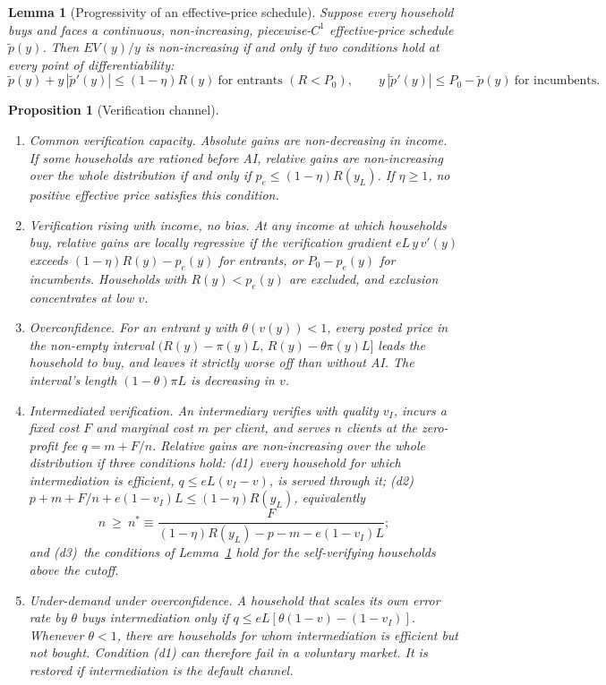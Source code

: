 \documentclass[12pt]{article}
\newtheorem{proposition}{Proposition}
\newtheorem{lemma}{Lemma}
\theoremstyle{remark}
\begin{document}
\begin{lemma}[Progressivity of an effective-price schedule]\label{lem:schedule}
Suppose every household buys and faces a continuous, non-increasing, piecewise-$C^1$ effective-price schedule $\tilde p(y)$. Then $EV(y)/y$ is non-increasing if and only if two conditions hold at every point of differentiability:
\[
\tilde p(y)+y\,|\tilde p'(y)|\le(1-\eta)R(y)\ \text{for entrants }(R<P_0),\qquad y\,|\tilde p'(y)|\le P_0-\tilde p(y)\ \text{for incumbents}.
\]
\end{lemma}

\begin{proposition}[Verification channel]\label{prop:verification}
\begin{enumerate}[label=(\alph*),itemsep=1pt]
\item \emph{Common verification capacity.} Absolute gains are non-decreasing in income. If some households are rationed before AI, relative gains are non-increasing over the whole distribution \emph{if and only if} $p_e\le(1-\eta)R(y_L)$. If $\eta\ge1$, no positive effective price satisfies this condition.
\item \emph{Verification rising with income, no bias.} At any income at which households buy, relative gains are locally regressive if the verification gradient $eL\,y\,v'(y)$ exceeds $(1-\eta)R(y)-p_e(y)$ for entrants, or $P_0-p_e(y)$ for incumbents. Households with $R(y)<p_e(y)$ are excluded, and exclusion concentrates at low $v$.
\item \emph{Overconfidence.} For an entrant $y$ with $\theta(v(y))<1$, every posted price in the non-empty interval $\big(R(y)-\pi(y)L,\,R(y)-\theta\pi(y)L\big]$ leads the household to buy, and leaves it strictly worse off than without AI. The interval's length $(1-\theta)\pi L$ is decreasing in $v$.
\item \emph{Intermediated verification.} An intermediary verifies with quality $v_I$, incurs a fixed cost $F$ and marginal cost $m$ per client, and serves $n$ clients at the zero-profit fee $q=m+F/n$. Relative gains are non-increasing over the whole distribution if three conditions hold: (d1)~every household for which intermediation is efficient, $q\le eL(v_I-v)$, is served through it; (d2)~$p+m+F/n+e(1-v_I)L\le(1-\eta)R(y_L)$, equivalently
\[
n\ \ge\ n^*\equiv\frac{F}{(1-\eta)R(y_L)-p-m-e(1-v_I)L};
\]
and (d3)~the conditions of Lemma~\ref{lem:schedule} hold for the self-verifying households above the cutoff.
\item \emph{Under-demand under overconfidence.} A household that scales its own error rate by $\theta$ buys intermediation only if $q\le eL[\theta(1-v)-(1-v_I)]$. Whenever $\theta<1$, there are households for whom intermediation is efficient but not bought. Condition (d1) can therefore fail in a voluntary market. It is restored if intermediation is the default channel.
\end{enumerate}
\end{proposition}
\end{document}
